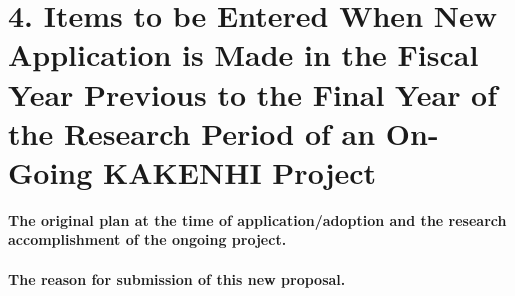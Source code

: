 
\section{4. Items to be Entered When New Application is Made in the Fiscal Year Previous to the Final Year of the Research Period of an On-Going KAKENHI Project}

\newcommand{\最終年度研究種目名}{基盤研究（Z）}
\newcommand{\最終年度研究課題番号}{99999}
\newcommand{\最終年度研究課題名}{シロナガスクジラの卵はなぜ見つけられないのか}
\newcommand{\最終年度研究期間}{平成25年度〜令和\一年目 年度}


\noindent
\textbf{The original plan at the time of application/adoption and the research accomplishment of the ongoing project.}\\
\vspace*{10zw} %
\\

\noindent
\textbf{The reason for submission of this new proposal. }\\



